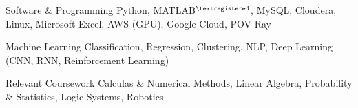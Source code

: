 

\begin{cvskills}

  \cvskill
    {Software \& Programming} %
    {Python, MATLAB$^{\tiny{\textregistered}}$, MySQL, Cloudera, Linux, Microsoft Excel, AWS (GPU), Google Cloud, POV-Ray} %

  \cvskill
    {Machine Learning} %
    {Classification, Regression, Clustering, NLP, Deep Learning (CNN, RNN, Reinforcement Learning)} %

   \cvskill
   {Relevant Coursework} %
   {Calculas \& Numerical Methods, Linear Algebra, Probability \& Statistics, Logic Systems, Robotics} %

\end{cvskills}
